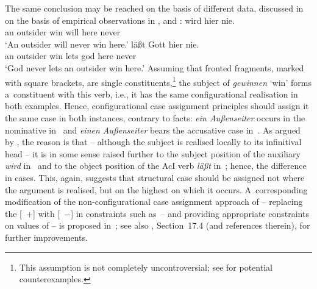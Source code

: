 \documentclass[output=paper]{langsci/langscibook}
\begin{document}
The same conclusion may be reached on the basis of different data, discussed in \citealt{Meurers99c,Meurers99b} on the basis of empirical observations in \citealt{Haider90a}, \citealt{Grewendorf94a} and \citealt{Mueller97c-Eng-Short-Cross}:
\eal
\ex \label{win:ss}
 wird hier nie. \\
     \phtm{[}an\NOM{} outsider win\INF{} will here never\\
\glt  `An outsider will never win here.'
\ex
\label{win:so}
 l\"a\ss{}t Gott hier nie. \\
    \phtm{[}an\ACC{} outsider win\INF{} lets god here never\\
\glt `God never lets an outsider win here.'
\zl
Assuming that fronted fragments, marked with square brackets, are single constituents,\footnote{This assumption is not completely uncontroversial; see \citet[100–101]{Kiss94} for potential counterexamples.} the subject of \emph{gewinnen} `win’ forms a~constituent with this verb, i.e., it has the same configurational realisation in both examples.  Hence, configurational case assignment principles should assign it the same case in both instances, contrary to facts: \emph{ein Au\ss{}enseiter} occurs in the nominative in~ and \emph{einen Au\ss{}enseiter} bears the accusative case in~.  As argued by \citealt{Meurers99c,Meurers99b}, the reason is that – although the subject is realised locally to its infinitival head – it is in some sense raised further to the subject position of the auxiliary \emph{wird} in~ and to the object position of the AcI verb \emph{l\"a\ss{}t} in~; hence, the difference in cases.  This, again, suggests that structural case should be assigned not where the argument is realised, but on the highest  on which it occurs.  A~corresponding modification of the non-configurational case assignment approach of \citealt{prze:96,Prze99,Prze99b} – replacing the [~$+$] with [~$-$] in constraints such as~– and providing appropriate constraints on values of  – is proposed in~\citealt[93–95]{Prze99b}; see also \citealt{MuellerLehrbuch3}, Section~17.4 (and references therein), for further improvements.
\end{document}
